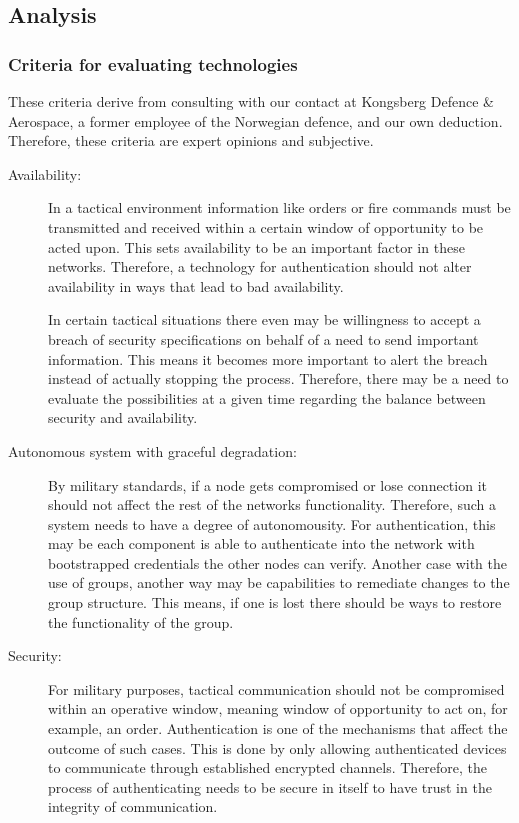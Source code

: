 \subsection{Analysis}
\label{2.1.2: Analysis_chap}

\subsubsection{Criteria for evaluating technologies}
These criteria derive from consulting with our contact at Kongsberg Defence \& Aerospace, a former employee of the Norwegian defence, and our own deduction. Therefore, these criteria are expert opinions and subjective.

\begin{description}
    \item[Availability:] In a tactical environment information like orders or fire commands must be transmitted and received within a certain window of opportunity to be acted upon. This sets availability to be an important factor in these networks. Therefore, a technology for authentication should not alter availability in ways that lead to bad availability.
    
    In certain tactical situations there even may be willingness to accept a breach of security specifications on behalf of a need to send important information. This means it becomes more important to alert the breach instead of actually stopping the process. Therefore, there may be a need to evaluate the possibilities at a given time regarding the balance between security and availability.
  
    \item[Autonomous system with graceful degradation:] By military standards, if a node gets compromised or lose connection it should not affect the rest of the networks functionality. Therefore, such a system needs to have a degree of autonomousity. For authentication, this may be each component is able to authenticate into the network with bootstrapped credentials the other nodes can verify. Another case with the use of groups, another way may be capabilities to remediate changes to the group structure. This means, if one is lost there should be ways to restore the functionality of the group.

    \item[Security:] For military purposes, tactical communication should not be compromised within an operative window, meaning window of opportunity to act on, for example, an order. Authentication is one of the mechanisms that affect the outcome of such cases. This is done by only allowing authenticated devices to communicate through established encrypted channels. Therefore, the process of authenticating needs to be secure in itself to have trust in the integrity of communication.


\end{description}
